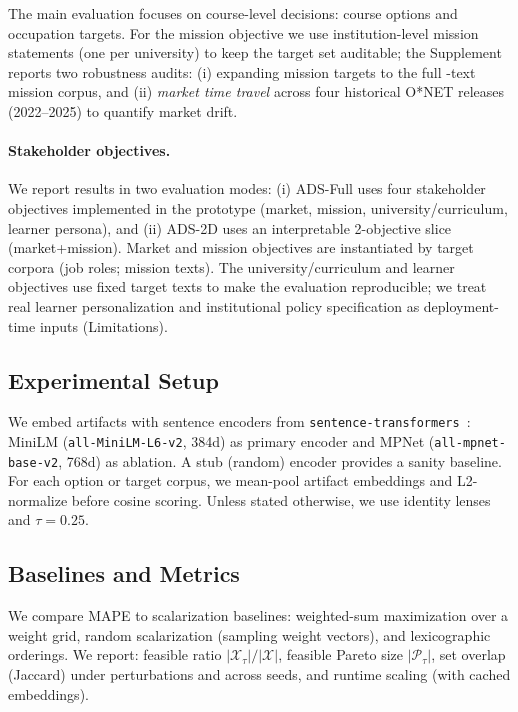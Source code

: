 \documentclass[sigconf,review]{acmart}
\newcommand{\MAPE}{\textsc{MAPE}\xspace}
\begin{document}
The {main evaluation} focuses on course-level decisions: \NumCourses course options and \NumOccupations occupation targets. For the mission objective we use {\NumMissionsMain} institution-level mission statements (one per university) to keep the target set auditable; the Supplement reports two robustness audits: (i) expanding mission targets to the full \NumMissionsExpanded-text mission corpus, and (ii) \emph{market time travel} across four historical O*NET releases (2022--2025) to quantify market drift.

\paragraph{Stakeholder objectives.}
We report results in two evaluation modes:
(i) {ADS-Full} uses four stakeholder objectives implemented in the prototype (market, mission, university/curriculum, learner persona), and
(ii) {ADS-2D} uses an interpretable 2-objective slice (market+mission).
Market and mission objectives are instantiated by target corpora (job roles; mission texts). The university/curriculum and learner objectives use fixed target texts to make the evaluation reproducible; we treat real learner personalization and institutional policy specification as deployment-time inputs (Limitations).

\subsection{Experimental Setup}
We embed artifacts with sentence encoders from \texttt{sentence-transformers}~\cite{reimers2019sentencebert}: MiniLM (\texttt{all-MiniLM-L6-v2}, 384d) as primary encoder and MPNet (\texttt{all-mpnet-base-v2}, 768d) as ablation. A stub (random) encoder provides a sanity baseline. For each option or target corpus, we mean-pool artifact embeddings and L2-normalize before cosine scoring. Unless stated otherwise, we use identity lenses and $\tau{=}0.25$.

\subsection{Baselines and Metrics}
We compare \MAPE to scalarization baselines: weighted-sum maximization over a weight grid, random scalarization (sampling weight vectors), and lexicographic orderings. We report: feasible ratio $|\mathcal{X}_\tau|/|\mathcal{X}|$, feasible Pareto size $|\mathcal{P}_\tau|$, set overlap (Jaccard) under perturbations and across seeds, and runtime scaling (with cached embeddings).
\end{document}
